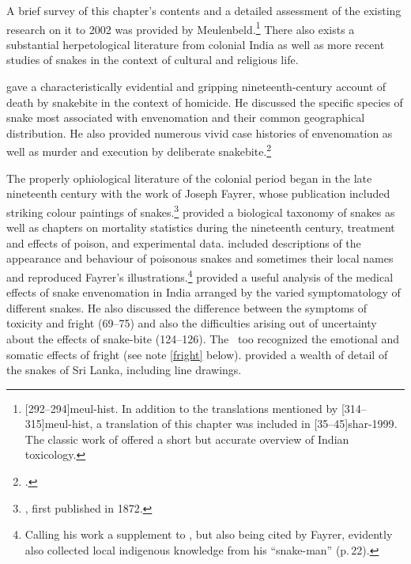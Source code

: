 A brief survey of this chapter's contents and a detailed assessment of
the existing research on it to 2002 was provided by
Meulenbeld.\footnote{[292--294]{meul-hist}. In addition to the
    translations mentioned by [314--315]{meul-hist}, a translation
    of this chapter was included in [35--45]{shar-1999}. The classic 
    work of \citet[\P93]{joll-1951} offered a short but accurate overview of 
    Indian toxicology.}  There
    also exists a substantial herpetological literature from colonial India
    as well as more recent studies of snakes in the context of cultural and
    religious life.
    
    
    \citet{chev-1870} gave a characteristically evidential and
    gripping nineteenth-century account of death by snakebite in the
    context of homicide.  He discussed the specific species of snake most
    associated with envenomation and their common geographical
    distribution. He also provided numerous vivid case histories of
    envenomation as well as murder and execution by deliberate
    snakebite.\footcite[368--386]{chev-1870}
    
    The properly ophiological literature of the colonial period began
in the late nineteenth century with the work of Joseph Fayrer,
whose publication included striking colour paintings of
snakes.\footnote{\cite{fayr-1874}, first published in 1872.}
    \citeauthor{fayr-1874} provided a biological taxonomy of snakes as
    well as chapters on mortality statistics during the nineteenth
    century, treatment and effects of poison, and experimental data.
    \citet{ewar-1878} included descriptions of the appearance and
    behaviour of poisonous snakes and sometimes their local names and
    reproduced Fayrer's illustrations.\footnote{Calling his work a
        supplement to \citet{fayr-1874}, but also being cited by Fayrer,
        \citeauthor{ewar-1878} evidently also collected local indigenous
        knowledge from his “snake-man” (p.\,22).}
        \citet[75--124]{wall-1913} provided a useful analysis of the
        medical effects of snake envenomation in India arranged by the
        varied symptomatology of different snakes.  He also discussed the
        difference between the symptoms of toxicity and fright (69--75)
        and also the difficulties arising out of uncertainty about the
        effects of snake-bite (124--126).  The \SS\ too recognized the
        emotional and somatic effects of fright (see note \ref{fright}
        below). \citet{wall-1921} provided a wealth of detail of the
        snakes of Sri Lanka, including line drawings.
            
